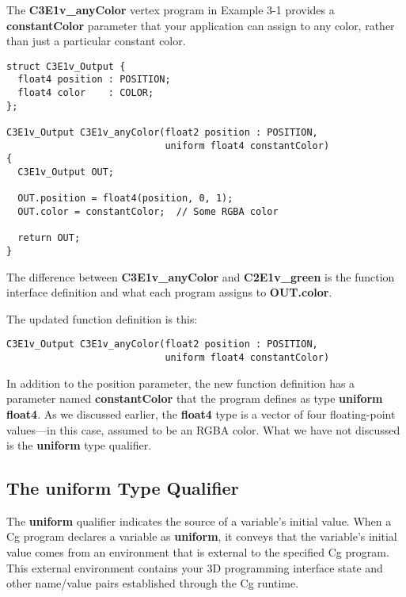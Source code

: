 \documentclass[../main.tex]{subfiles}
\begin{document}
The \textbf{C3E1v_anyColor} vertex program in Example 3-1 provides a \textbf{constantColor} parameter that your application can assign to any color, rather than just a particular constant color.

\FloatBarrier
\begin{lstlisting}[caption=Example 3-1. The \textbf{C3E1v_anyColor} Vertex Program]
struct C3E1v_Output {
  float4 position : POSITION;
  float4 color    : COLOR;
};

C3E1v_Output C3E1v_anyColor(float2 position : POSITION,
                            uniform float4 constantColor)
{
  C3E1v_Output OUT;

  OUT.position = float4(position, 0, 1);
  OUT.color = constantColor;  // Some RGBA color

  return OUT;
}
\end{lstlisting}
\FloatBarrier

The difference between \textbf{C3E1v_anyColor} and \textbf{C2E1v_green} is the function interface definition and what each program assigns to \textbf{OUT.color}.

The updated function definition is this:

\FloatBarrier
\begin{lstlisting}
C3E1v_Output C3E1v_anyColor(float2 position : POSITION,
                            uniform float4 constantColor)
\end{lstlisting}
\FloatBarrier

In addition to the position parameter, the new function definition has a parameter named \textbf{constantColor} that the program defines as type \textbf{uniform float4}. As we discussed earlier, the \textbf{float4} type is a vector of four floating-point values—in this case, assumed to be an RGBA color. What we have not discussed is the \textbf{uniform} type qualifier.

\subsection*{The uniform Type Qualifier}

The \textbf{uniform} qualifier indicates the source of a variable's initial value. When a Cg program declares a variable as \textbf{uniform}, it conveys that the variable's initial value comes from an environment that is external to the specified Cg program. This external environment contains your 3D programming interface state and other name/value pairs established through the Cg runtime.
\end{document}
